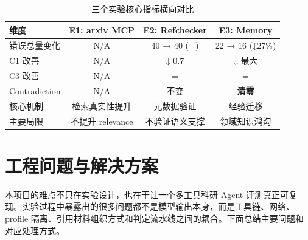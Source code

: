 \documentclass[UTF8,fontset=fandol,a4paper,12pt]{ctexart}
\begin{document}
\begin{table}[htbp]
  \centering
  \caption{三个实验核心指标横向对比}
  \begin{tabular}{@{}lccc@{}}
    \toprule
    维度 & E1: arxiv MCP & E2: Refchecker & E3: Memory \\
    \midrule
    错误总量变化 & N/A & 40 → 40 (=) & 22 → 16 (↓27\%) \\
    C1 改善 & N/A & ↓ 0.7 & ↓ 最大 \\
    C3 改善 & N/A & = & = \\
    Contradiction & N/A & 不变 & \textbf{清零} \\
    核心机制 & 检索真实性提升 & 元数据验证 & 经验迁移 \\
    主要局限 & 不提升 relevance & 不验证语义支撑 & 领域知识鸿沟 \\
    \bottomrule
  \end{tabular}
\end{table}

\section{工程问题与解决方案}

本项目的难点不只在实验设计，也在于让一个多工具科研 Agent 评测真正可复现。实验过程中暴露出的很多问题都不是模型输出本身，而是工具链、网络、profile 隔离、引用材料组织方式和判定流水线之间的耦合。下面总结主要问题和对应处理方式。
\end{document}
